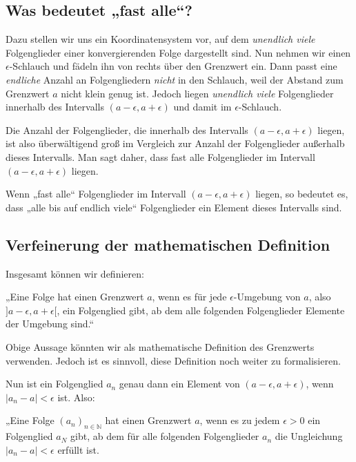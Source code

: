 \documentclass[fontsize=9pt,
               parskip=half-,
               DIV=14,
               listof=chapterentry,
               tocflat]{scrbook}
\begin{document}
\subsection{Was bedeutet „fast alle“?}

Dazu stellen wir uns ein Koordinatensystem vor, auf dem \emph{unendlich viele} Folgenglieder einer konvergierenden Folge dargestellt sind. Nun nehmen wir einen $\epsilon $-Schlauch und fädeln ihn von rechts über den Grenzwert ein. Dann passt eine \emph{endliche} Anzahl an Folgengliedern \emph{nicht} in den Schlauch, weil der Abstand zum Grenzwert $a$ nicht klein genug ist. Jedoch liegen \emph{unendlich viele} Folgenglieder innerhalb des Intervalls $(a-\epsilon ,a+\epsilon )$ und damit im $\epsilon $-Schlauch.

Die Anzahl der Folgenglieder, die innerhalb des Intervalls $(a-\epsilon ,a+\epsilon )$ liegen, ist also überwältigend groß im Vergleich zur Anzahl der Folgenglieder außerhalb dieses Intervalls. Man sagt daher, dass fast alle Folgenglieder im Intervall $(a-\epsilon ,a+\epsilon )$ liegen.

Wenn „fast alle“ Folgenglieder im Intervall $(a-\epsilon ,a+\epsilon )$ liegen, so bedeutet es, dass „alle bis auf endlich viele“ Folgenglieder ein Element dieses Intervalls sind.

\subsection{Verfeinerung der mathematischen Definition}

Insgesamt können wir definieren:

\begin{importantparagraph*}
„Eine Folge hat einen Grenzwert $a$, wenn es für jede $\epsilon $-Umgebung von $a$, also $]a-\epsilon ,a+\epsilon [$, ein Folgenglied gibt, ab dem alle folgenden Folgenglieder Elemente der Umgebung sind.“

\end{importantparagraph*}

Obige Aussage könnten wir als mathematische Definition des Grenzwerts verwenden. Jedoch ist es sinnvoll, diese Definition noch weiter zu formalisieren.

Nun ist ein Folgenglied $a_{n}$ genau dann ein Element von $(a-\epsilon ,a+\epsilon )$, wenn $|a_{n}-a|<\epsilon $ ist. Also:

\begin{importantparagraph*}
„Eine Folge $\left(a_{n}\right)_{n\in \mathbb {N} }$ hat einen Grenzwert $a$, wenn es zu jedem $\epsilon >0$ ein Folgenglied $a_{N}$ gibt, ab dem für alle folgenden Folgenglieder $a_{n}$ die Ungleichung $|a_{n}-a|<\epsilon $ erfüllt ist.

\end{importantparagraph*}
\end{document}
